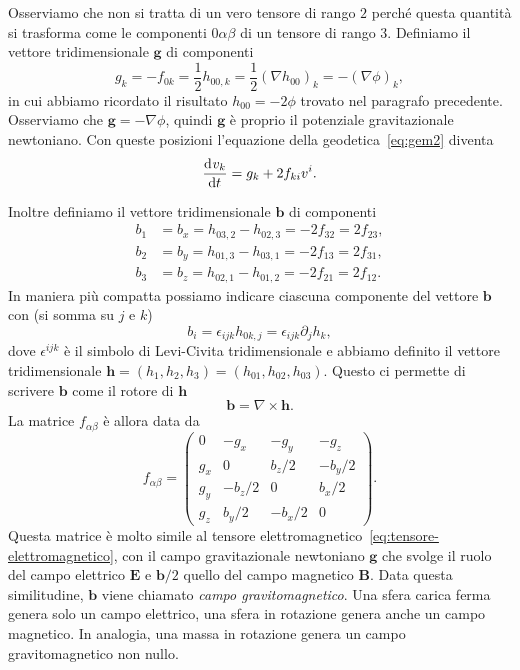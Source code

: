 Osserviamo che non si tratta di un vero tensore di rango $2$ perché questa
quantità si trasforma come le componenti $0\alpha\beta$ di un tensore di rango
$3$.  Definiamo il vettore tridimensionale $\bm{g}$ di componenti
\begin{equation}
  g_{k} = -f_{0k} = \frac{1}{2}h_{00,k} = \frac{1}{2}(\nabla h_{00})_{k} =
  -(\nabla \phi)_{k},
\end{equation}
in cui abbiamo ricordato il risultato $h_{00} = -2\phi$ trovato nel paragrafo
precedente.  Osserviamo che $\bm{g} = -\nabla \phi$, quindi $\bm{g}$ è proprio
il potenziale gravitazionale newtoniano.  Con queste posizioni l'equazione della
geodetica~\eqref{eq:gem2} diventa
\begin{equation}
  \label{eq:gem3}
  \frac{{\mathop{}\!\mathrm{d}^{}}v_{k}}{\mathop{}\!\mathrm{d} {t}^{}} = g_{k} + 2f_{ki}v^{i}.
\end{equation}

Inoltre definiamo il vettore
tridimensionale $\bm{b}$ di componenti
\begin{subequations}
  \begin{align}
    b_{1} &= b_{x} = h_{03,2} - h_{02,3} = -2f_{32} = 2f_{23}, \\
    b_{2} &= b_{y} = h_{01,3} - h_{03,1} = -2f_{13} = 2f_{31}, \\
    b_{3} &= b_{z} = h_{02,1} - h_{01,2} = -2f_{21} = 2f_{12}.
  \end{align}
\end{subequations}
In maniera più compatta possiamo indicare ciascuna componente del vettore
$\bm{b}$ con (si somma su $j$ e $k$)
\begin{equation}
  b_{i} = \epsilon_{ijk}h_{0k,j} = \epsilon_{ijk}\partial_{j}h_{k},
\end{equation}
dove $\epsilon^{ijk}$ è il simbolo di Levi-Civita tridimensionale e abbiamo
definito il vettore tridimensionale
$\bm{h} = (h_{1}, h_{2}, h_{3}) = (h_{01}, h_{02}, h_{03})$.  Questo ci permette
di scrivere $\bm{b}$ come il rotore di $\bm{h}$
\begin{equation}
  \bm{b} = \nabla \times \bm{h}.
\end{equation}
La matrice $f_{\alpha\beta}$ è allora data da
\begin{equation}
  f_{\alpha\beta} =
  \begin{pmatrix}
    0     & -g_{x}   & -g_{y}   & -g_{z}   \\
    g_{x} & 0        & b_{z}/2  & -b_{y}/2 \\
    g_{y} & -b_{z}/2 & 0        & b_{x}/2  \\
    g_{z} & b_{y}/2  & -b_{x}/2 & 0
  \end{pmatrix}.
\end{equation}
Questa matrice è molto simile al tensore
elettromagnetico~\eqref{eq:tensore-elettromagnetico}, con il campo
gravitazionale newtoniano $\bm{g}$ che svolge il ruolo del campo elettrico
$\bm{E}$ e $\bm{b}/2$ quello del campo magnetico $\bm{B}$.  Data questa
similitudine, $\bm{b}$ viene chiamato \emph{campo gravitomagnetico}.  Una sfera
carica ferma genera solo un campo elettrico, una sfera in rotazione genera anche
un campo magnetico.  In analogia, una massa in rotazione genera un campo
gravitomagnetico non nullo.

